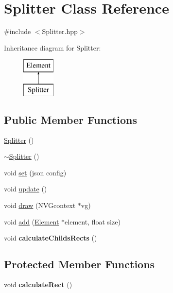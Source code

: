 \hypertarget{class_splitter}{}\section{Splitter Class Reference}
\label{class_splitter}


{\ttfamily \#include $<$Splitter.\+hpp$>$}

Inheritance diagram for Splitter\+:\begin{figure}[H]
\begin{center}
\leavevmode
\includegraphics[height=2.000000cm]{class_splitter}
\end{center}
\end{figure}
\subsection*{Public Member Functions}
\begin{DoxyCompactItemize}
\item 
\hyperlink{class_splitter_ac62b02b8374ebe8dfdf6c34fbd59c2a1}{Splitter} ()
\item 
\hyperlink{class_splitter_a43e6a2b28ecf48a2127840a5fbf5fb3f}{$\sim$\+Splitter} ()
\item 
void \hyperlink{class_splitter_a38aab36f28b7f5b834fefae247f5c37e}{set} (json config)
\item 
void \hyperlink{class_splitter_aab6c9e9479d8208e1959eb9fbfbcdfeb}{update} ()
\item 
void \hyperlink{class_splitter_acdda30b580520e68531dfa90511a8514}{draw} (N\+V\+Gcontext $\ast$vg)
\item 
void \hyperlink{class_splitter_a4cfa6bad909de07691b290f56de1a175}{add} (\hyperlink{class_element}{Element} $\ast$element, float size)
\item 
\mbox{\label{class_splitter_a9c611ab26d0cd4b5bdd4098ed55752fc}} 
void {\bfseries calculate\+Childs\+Rects} ()
\end{DoxyCompactItemize}
\subsection*{Protected Member Functions}
\begin{DoxyCompactItemize}
\item 
\mbox{\label{class_splitter_a9f1eec80a14195e074e93e0d4305d2f0}} 
void {\bfseries calculate\+Rect} ()
\end{DoxyCompactItemize}
